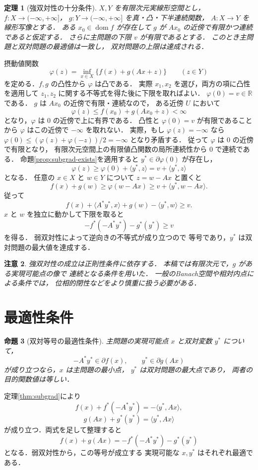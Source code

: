 \documentclass[a5paper,10pt,onecolumn]{jsarticle}
\makeatletter
\theoremstyle{mathnotetheorem}
\newtheorem{theorem}{定理}[section]
\newtheorem{proposition}[theorem]{命題}
\newtheorem{remark}[theorem]{注意}
\renewcommand{\proofname}{証明}
\renewenvironment{proof}[1][\proofname]{%
  \par\pushQED{\qed}\normalfont\topsep4\p@\@plus2\p@\relax
  \trivlist\item[\hskip\labelsep\bfseries #1]\ignorespaces
}{\popQED\endtrivlist\@endpefalse}
\makeatother
\begin{document}
\begin{theorem}[強双対性の十分条件]\label{thm:strong-duality}
$X,Y$ を有限次元実線形空間とし，
$f:X\to(-\infty,+\infty]$，
$g:Y\to(-\infty,+\infty]$ を真・凸・下半連続関数，
$A:X\to Y$ を線形写像とする．
ある $x_0\in\operatorname{dom}f$ が存在して
$g$ が $Ax_0$ の近傍で有限かつ連続であると仮定する．
さらに主問題の下限 $v$ が有限であるとする．
このとき主問題と双対問題の最適値は一致し，
双対問題の上限は達成される．
\end{theorem}
\begin{proof}
摂動値関数
\[
 \varphi(z)=\inf_{x\in X}\{f(x)+g(Ax+z)\}
 \qquad(z\in Y)
\]
を定める．$f,g$ の凸性から $\varphi$ は凸である．
実際 $x_1,x_2$ を選び，両方の項に凸性を適用して
$z_1,z_2$ に関する不等式を得た後に下限を取ればよい．
$\varphi(0)=v\in\mathbb R$ である．
$g$ は $Ax_0$ の近傍で有限・連続なので，
ある近傍 $U$ において
\[
 \varphi(z)\le f(x_0)+g(Ax_0+z)<\infty
\]
となり，$\varphi$ は $0$ の近傍で上に有界である．
凸性と $\varphi(0)=v$ が有限であることから
$\varphi$ はこの近傍で $-\infty$ を取れない．
実際，もし $\varphi(z)=-\infty$ なら
$\varphi(0)\le(\varphi(z)+\varphi(-z))/2=-\infty$
となり矛盾する．
従って $\varphi$ は $0$ の近傍で有限となり，
有限次元空間上の有限値凸関数の局所連続性から
$0$ で連続である．
命題\ref{prop:subgrad-exists}を適用すると
$y^*\in\partial\varphi(0)$ が存在し，
\[
 \varphi(z)\ge\varphi(0)+\langle y^*,z\rangle
 =v+\langle y^*,z\rangle
\]
となる．
任意の $x\in X$ と $w\in Y$ について
$z=w-Ax$ と置くと
\[
 f(x)+g(w)\ge\varphi(w-Ax)
 \ge v+\langle y^*,w-Ax\rangle.
\]
従って
\[
 f(x)+\langle A^*y^*,x\rangle
 +g(w)-\langle y^*,w\rangle\ge v.
\]
$x$ と $w$ を独立に動かして下限を取ると
\[
 -f^*(-A^*y^*)-g^*(y^*)\ge v
\]
を得る．
弱双対性によって逆向きの不等式が成り立つので
等号であり，$y^*$ は双対問題の最大値を達成する．
\end{proof}

\begin{remark}
強双対性の成立は正則性条件に依存する．
本稿では有限次元で，$g$ がある実現可能点の像で
連続となる条件を用いた．
一般のBanach空間や相対内点による条件では，
位相的閉性などをより慎重に扱う必要がある．
\end{remark}

\section{最適性条件}

\begin{proposition}[双対等号の最適性条件]\label{prop:optimality}
主問題の実現可能点 $x$ と双対変数 $y^*$ について，
\[
 -A^*y^*\in\partial f(x),\qquad
 y^*\in\partial g(Ax)
\]
が成り立つなら，$x$ は主問題の最小点，
$y^*$ は双対問題の最大点であり，
両者の目的関数値は等しい．
\end{proposition}
\begin{proof}
定理\ref{thm:subgrad}により
\[
 f(x)+f^*(-A^*y^*)=-\langle y^*,Ax\rangle,
\]
\[
 g(Ax)+g^*(y^*)=\langle y^*,Ax\rangle
\]
が成り立つ．両式を足して整理すると
\[
 f(x)+g(Ax)
 =-f^*(-A^*y^*)-g^*(y^*)
\]
となる．弱双対性から，この等号が成立する
実現可能な $x,y^*$ はそれぞれ最適である．
\end{proof}
\end{document}
